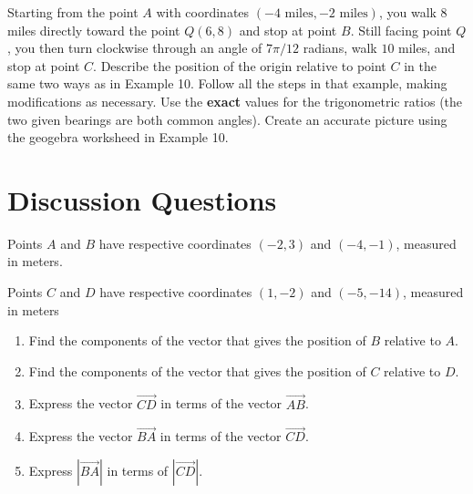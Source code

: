 \documentclass{ximera}
\begin{document}
\begin{question}  \label{Qgtsygh:Vectors}
Starting from the point $A$ with coordinates $(-4 \text{ miles},-2 \text{ miles})$, you walk $8$ miles directly toward the point $Q(6,8)$ and stop at point $B$. Still facing point $Q$, you then turn clockwise through an angle of $7\pi/12$ radians, walk $10$ miles, and stop at point $C$. Describe the position of the origin relative to point $C$ in the same two ways as in Example 10. Follow all the steps in that example, making modifications as necessary. Use the {\bf exact} values for the trigonometric ratios (the two given bearings are both common angles).  Create an accurate picture using the geogebra worksheed in Example 10.


\end{question}

\section{Discussion Questions}

\begin{question}  \label{QPoDfdlLDCZXZ}
Points $A$ and $B$ have respective coordinates $(-2,3)$ and $(-4,-1)$, measured in meters.

Points $C$ and $D$ have respective coordinates $(1,-2)$ and $(-5,-14)$, measured in meters

\begin{enumerate}
\item Find the components of the vector that gives the position of $B$ relative to $A$.

\item Find the components of the vector that gives the position of $C$ relative to $D$.

\item Express the vector $\overrightarrow{CD}$ in terms of the vector $\overrightarrow{AB}$.

\item Express the vector $\overrightarrow{BA}$ in terms of the vector $\overrightarrow{CD}$.

\item Express $|\overrightarrow{BA}|$ in terms of $|\overrightarrow{CD}|$.
\end{enumerate}
\end{question}
\end{document}
